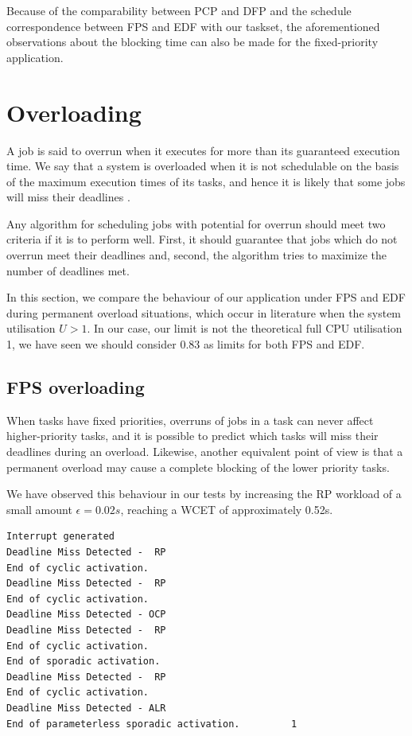 \documentclass{article}
\begin{document}
Because of the comparability between PCP and DFP and the schedule correspondence between FPS and EDF with our taskset, the aforementioned observations about the blocking time can also be made for the fixed-priority application.

\section{Overloading}

A job is said to overrun when it executes for more than its guaranteed execution time. We say that a system is overloaded when it is not schedulable on the basis of the maximum execution times of its tasks, and hence it is likely that some jobs will miss their deadlines \cite{liu-overload}.

Any algorithm for scheduling jobs with potential for overrun should meet two criteria if it is to perform well. First, it should guarantee that jobs which do not overrun meet their deadlines and, second, the algorithm tries to maximize the number of deadlines met.

In this section, we compare the behaviour of our application under FPS and EDF during permanent overload situations, which occur in literature when the system utilisation $U > 1$. In our case, our limit is not the theoretical full CPU utilisation 1, we have seen we should consider 0.83 as limits for both FPS and EDF.

\subsection{FPS overloading}

When tasks have fixed priorities, overruns of jobs in a task can never affect higher-priority tasks, and it is possible to predict which tasks will miss their deadlines during an overload. Likewise, another equivalent point of view is that a permanent overload may cause a complete blocking of the lower priority tasks.

We have observed this behaviour in our tests by increasing the RP workload of a small amount $\epsilon = 0.02s$, reaching a WCET of approximately 0.52s.

\begin{lstlisting}
Interrupt generated
Deadline Miss Detected -  RP
End of cyclic activation.
Deadline Miss Detected -  RP
End of cyclic activation.
Deadline Miss Detected - OCP
Deadline Miss Detected -  RP
End of cyclic activation.
End of sporadic activation.
Deadline Miss Detected -  RP
End of cyclic activation.
Deadline Miss Detected - ALR
End of parameterless sporadic activation.         1
\end{lstlisting}
\end{document}
